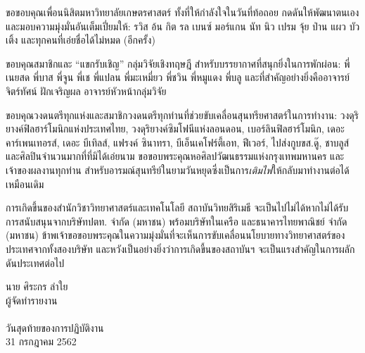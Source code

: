\documentclass[16pt,a4]{internshipreport}
\begin{document}
ขอขอบคุณเพื่อนนิสิตมหาวิทยาลัยเกษตรศาสตร์ ทั้งที่ให้กำลังใจในวันที่ท้อถอย
กดดันให้พัฒนาตนเอง และมอบความมุ่งมั่นอันเต็มเปี่ยมให้: รวิส อ้น กิต รล เบนซ์ มอร์แกน นัท นิว เปรม จุ้ย ป่าน แผว บัว เติ้ง
และทุกคนที่เอ่ยชื่อได้ไม่หมด (อีกครั้ง)

ขอบคุณสมาชิกและ ``แขกรับเชิญ'' กลุ่มวิจัยเชิงทฤษฎี สำหรับบรรยากาศที่สนุกยิ่งในการพักผ่อน: พี่เนยสด พี่บาส พี่จูน พี่เช พี่แปลน พี่มะเหมี่ยว พี่ชวิน พี่หมูแดง พี่บลู
และที่สำคัญอย่างยิ่งคืออาจารย์จิตร์ทัศน์ ฝักเจริญผล อาจารย์หัวหน้ากลุ่มวิจัย

ขอบคุณวงดนตรีทุกแห่งและสมาชิกวงดนตรีทุกท่านที่ช่วยขับเคลื่อนสุนทรียศาสตร์ในการทำงาน: วงดุริยางค์ฟิลฮาร์โมนิกแห่งประเทศไทย, วงดุริยางค์ซิมโฟนีแห่งลอนดอน, เบอร์ลินฟิลฮาร์โมนิก, เดอะ คาร์เพนเทอรส์, เดอะ บีเทิลส์, แฟรงค์ ซินาทรา, บีเอ็นเคโฟร์ตี้เอท, ฟีเวอร์, ไปส่งกูบขส.ดู๊, ชาบลูส์ และศิลปินจำนวนมากที่ที่มิได้เอ่ยนาม ขอขอบพระคุณหอศิลปวัฒนธรรมแห่งกรุงเทพมหานคร และเจ้าของผลงานทุกท่าน สำหรับอารมณ์สุนทรีย์ในยามวันหยุดซึ่งเป็นการ\textit{เติมไฟ}ให้กลับมาทำงานต่อได้เหมือนเดิม

การเกิดขึ้นของสำนักวิชาวิทยาศาสตร์และเทคโนโลยี สถาบันวิทยสิริเมธี จะเป็นไปไม่ได้หากไม่ได้รับการสนับสนุนจากบริษัทปตท. จำกัด (มหาชน) พร้อมบริษัทในเครือ และธนาคารไทยพาณิชย์ จำกัด (มหาชน)  ข้าพเจ้าขอขอบพระคุณในความมุ่งมั่นที่จะเห็นการขับเคลื่อนนโยบายทางวิทยาศาสตร์ของประเทศจากทั้งสองบริษัท และหวังเป็นอย่างยิ่งว่าการเกิดขี้นของสถาบันฯ จะเป็นแรงสำคัญในการผลักดันประเทศต่อไป

\vskip 20pt

\hfill\begin{minipage}
    {\dimexpr 5cm}
    \begin{center}
        นาย ศิระกร ลำใย\\
        ผู้จัดทำรายงาน\\~\\

        วันสุดท้ายของการปฏิบัติงาน\\
        31 กรกฎาคม 2562
    \end{center}
    \xdef\tpd{\the\prevdepth}
\end{minipage}
\end{document}
